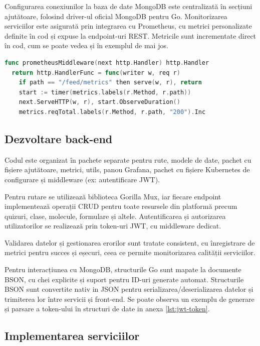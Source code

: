 Configurarea conexiunilor la baza de date MongoDB este centralizată în secțiuni ajutătoare, folosind driver-ul
oficial MongoDB pentru Go. Monitorizarea serviciilor este asigurată prin integrarea cu Prometheus,
cu metrici personalizate definite în cod și expuse la endpoint-uri REST. Metricile sunt incrementate
direct în cod, cum se poate vedea și în exemplul de mai jos.
\begin{lstlisting}[language=Go, caption={Middleware Prometheus pentru monitorizarea duratei cererilor HTTP}]
func prometheusMiddleware(next http.Handler) http.Handler
  return http.HandlerFunc = func(writer w, req r)
    if path == "/feed/metrics" then serve(w, r), return
    start := timer(metrics.labels(r.Method, r.path))
    next.ServeHTTP(w, r), start.ObserveDuration()
    metrics.reqTotal.labels(r.Method, r.path, "200").Inc
\end{lstlisting}

\subsection{Dezvoltare back-end}
\label{subsec:implementare-backend}

Codul este organizat în pachete separate pentru rute, modele de date, pachet cu fișiere ajutătoare, metrici,
utils, panou Grafana, pachet cu fișiere Kubernetes de configurare și middleware (ex: autentificare JWT).

Pentru rutare se utilizează biblioteca Gorilla Mux, iar fiecare endpoint implementează operații
CRUD pentru toate resursele din platformă precum quizuri, clase, molecule, formulare și altele.
Autentificarea și autorizarea utilizatorilor se realizează prin token-uri JWT, cu middleware dedicat.

Validarea datelor și gestionarea erorilor sunt tratate consistent, cu înregistrare de metrici
pentru succes și eșecuri, ceea ce permite monitorizarea calității serviciilor.

Pentru interacțiunea cu MongoDB, structurile Go sunt mapate la documente BSON, cu chei explicite 
și suport pentru ID-uri generate automat. Structurile BSON sunt convertite nativ in JSON pentru
serializarea/deserializarea datelor și trimiterea lor între servicii și front-end. Se poate observa
un exemplu de generare și parsare a token-ului în structuri de date in anexa \ref{lst:jwt-token}.

\subsection{Implementarea serviciilor}
\label{subsec:implementare-servicii}

